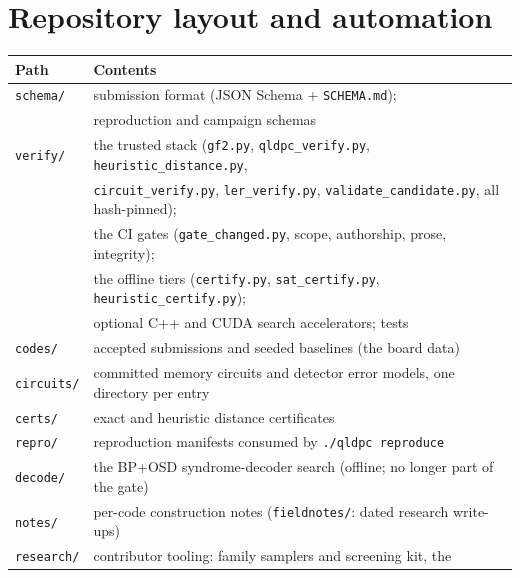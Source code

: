 \documentclass[11pt]{article}
\begin{document}
	\section{Repository layout and automation}

	\begin{center}
		\begin{tabular}{ll}
			\toprule
			Path & Contents\\
			\midrule
			\texttt{schema/}    & submission format (JSON Schema + \texttt{SCHEMA.md});\\
			                    & reproduction and campaign schemas\\
			\texttt{verify/}    & the trusted stack (\texttt{gf2.py},
			                      \texttt{qldpc\_verify.py},
			                      \texttt{heuristic\_distance.py},\\
			                    & \texttt{circuit\_verify.py}, \texttt{ler\_verify.py},
			                      \texttt{validate\_candidate.py}, all hash-pinned);\\
			                    & the CI gates (\texttt{gate\_changed.py}, scope,
			                      authorship, prose, integrity);\\
			                    & the offline tiers (\texttt{certify.py},
			                      \texttt{sat\_certify.py},
			                      \texttt{heuristic\_certify.py});\\
			                    & optional C++ and CUDA search accelerators; tests\\
			\texttt{codes/}     & accepted submissions and seeded baselines
			                      (the board data)\\
			\texttt{circuits/}  & committed memory circuits and detector error
			                      models, one directory per entry\\
			\texttt{certs/}     & exact and heuristic distance certificates\\
			\texttt{repro/}     & reproduction manifests consumed by
			                      \texttt{./qldpc reproduce}\\
			\texttt{decode/}    & the BP+OSD syndrome-decoder search (offline;
			                      no longer part of the gate)\\
			\texttt{notes/}     & per-code construction notes
			                      (\texttt{fieldnotes/}: dated research write-ups)\\
			\texttt{research/}  & contributor tooling: family samplers and
			                      screening kit, the\\

\end{tabular}
\end{center}
\end{document}
